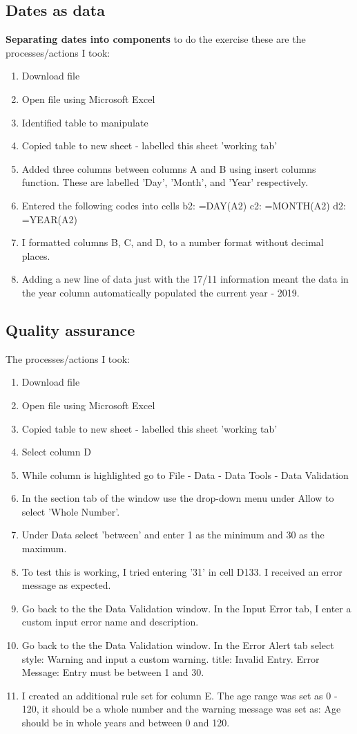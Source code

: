 \documentclass{article}
\begin{document}
\subsection{Dates as data}
\textbf{Separating dates into components}
to do the exercise these are the processes/actions I took:
\begin{enumerate}
    \item Download file
    \item Open file using Microsoft Excel
    \item Identified table to manipulate
    \item Copied table to new sheet - labelled this sheet 'working tab'
    \item Added three columns between columns A and B using insert columns function. These are labelled 'Day', 'Month', and 'Year' respectively.
    \item Entered the following codes into cells b2: =DAY(A2) c2: =MONTH(A2) d2: =YEAR(A2)
    \item I formatted columns B, C, and D, to a number format without decimal places. 
    \item Adding a new line of data just with the 17/11 information meant the data in the year column automatically populated the current year - 2019. 
\end{enumerate}

\subsection{Quality assurance}
The processes/actions I took:
\begin{enumerate}
    \item Download file
    \item Open file using Microsoft Excel
    \item Copied table to new sheet - labelled this sheet 'working tab'
    \item Select column D
    \item While column is highlighted go to File - Data - Data Tools - Data Validation
    \item In the section tab of the window use the drop-down menu under Allow to select 'Whole Number'.
    \item Under Data select 'between' and enter 1 as the minimum and 30 as the maximum. 
    \item To test this is working, I tried entering '31' in cell D133. I received an error message as expected. 
    \item Go back to the the Data Validation window. In the Input Error tab, I enter a custom input error name and description.
    \item Go back to the the Data Validation window. In the Error Alert tab select style: Warning and input a custom warning. title: Invalid Entry. Error Message: Entry must be between 1 and 30.
    \item I created an additional rule set for column E. The age range was set as 0 - 120, it should be a whole number and the warning message was set as: Age should be in whole years and between 0 and 120.
\end{enumerate}
\end{document}
